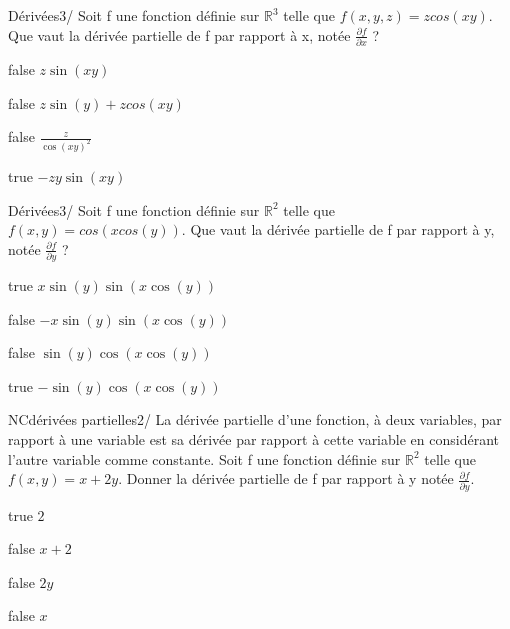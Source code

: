          \begin{question}{22}{Dérivées}{3}{/}
               Soit f une fonction définie sur $\mathbb{R}^{3}$ telle que $f(x,y,z) = zcos(xy)$. Que vaut la dérivée partielle de f par rapport à x, notée $\frac{\partial f}{\partial x}$ ?
        \end{question}
        \begin{reponses}
        	\item[false]  $z\sin(xy)$
        	\item[false]  $z\sin(y)+zcos(xy)$
            \item[false]  $\frac{z}{\cos(xy)^2}$
            \item[true]  $-zy\sin(xy)$
        \end{reponses}
         \begin{question}{22}{Dérivées}{3}{/}
               Soit f une fonction définie sur $\mathbb{R}^{2}$ telle que $f(x,y) = cos(xcos(y))$. Que vaut la dérivée partielle de f par rapport à y, notée $\frac{\partial f}{\partial y}$ ?
        \end{question}
        \begin{reponses}
        	\item[true]  $x\sin(y)\sin(x\cos(y))$
        	\item[false]  $-x\sin(y)\sin(x\cos(y))$
            \item[false]  $\sin(y)\cos(x\cos(y))$
            \item[true]  $-\sin(y)\cos(x\cos(y))$
        \end{reponses}
          \begin{question}{NC}{dérivées partielles}{2}{/} 
            La dérivée partielle d'une fonction, à deux variables, par rapport à une variable est sa dérivée par rapport à cette variable en considérant l'autre variable comme constante. Soit f une fonction définie sur $\mathbb{R}^{2}$ telle que $f(x,y) = x + 2y $. Donner la dérivée partielle de f par rapport à y notée $\frac{\partial f}{\partial y}$.  
            \end{question}
            \begin{reponses}
            	\item[true]  $2$
            	\item[false]  $x+2$
                \item[false]   $2y$
                \item[false]    $x$
            \end{reponses}
